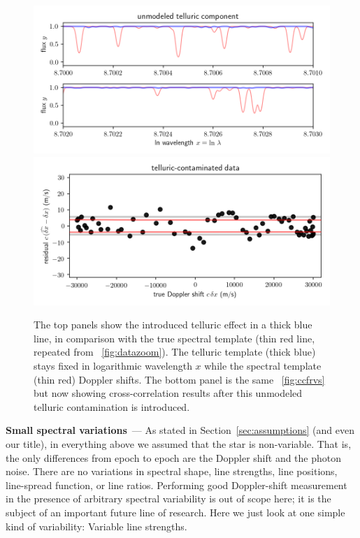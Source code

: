 \documentclass[modern]{aastex631}
\renewcommand{\paragraph}[1]{\bigskip\noindent\textbf{#1}~---}
\newcommand{\sectionname}{Section}
\newcommand{\secref}[1]{\sectionname~\ref{#1}}
\newcommand{\figref}[1]{\figurename~\ref{#1}}
\begin{document}
\begin{figure}[tp]
  \begin{mdframed}
    \begin{center}
    \includegraphics[width=\textwidth]{../notebook/telluricmodel.png}
    \includegraphics[width=\textwidth]{../notebook/telluric.png}
    \end{center}
    \caption{The top panels show the introduced telluric effect in a thick blue line, in comparison with the true spectral template (thin red line, repeated from \figref{fig:datazoom}). The telluric template (thick blue) stays fixed in logarithmic wavelength $x$ while the spectral template (thin red) Doppler shifts. The bottom panel is the same \figref{fig:ccfrvs} but now showing cross-correlation results after this unmodeled telluric contamination is introduced.\label{fig:telluric}}
  \end{mdframed}
\end{figure}

\paragraph{Small spectral variations}
As stated in \secref{sec:assumptions} (and even our title), in everything above we assumed that the star is non-variable. That is, the only differences from epoch to epoch are the Doppler shift and the photon noise.
There are no variations in spectral shape, line strengths, line positions, line-spread function, or line ratios.
Performing good Doppler-shift measurement in the presence of arbitrary spectral variability is out of scope here; it is the subject of an important future line of research.
Here we just look at one simple kind of variability: Variable line strengths.
\end{document}
